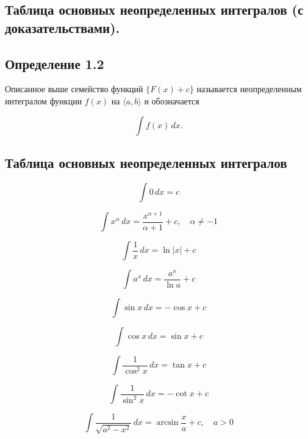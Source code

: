 {
\subsection{Таблица основных неопределенных интегралов (с доказательствами).}
\subsection*{Определение 1.2}

Описанное выше семейство функций \( \{F(x) + c\} \) называется неопределенным интегралом функции \( f(x) \) на \( \langle a,b \rangle \) и обозначается

\[
\int f(x) \,dx.
\]

\subsection*{Таблица основных неопределенных интегралов}

\begin{equation}
\int 0 \,dx = c
\end{equation}

\begin{equation}
\int x^\alpha \,dx = \frac{x^{\alpha+1}}{\alpha+1} + c, \quad \alpha \neq -1
\end{equation}

\begin{equation}
\int \frac{1}{x} \,dx = \ln |x| + c
\end{equation}

\begin{equation}
\int a^x \,dx = \frac{a^x}{\ln a} + c
\end{equation}

\begin{equation}
\int \sin x \,dx = -\cos x + c
\end{equation}

\begin{equation}
\int \cos x \,dx = \sin x + c
\end{equation}

\begin{equation}
\int \frac{1}{\cos^2 x} \,dx = \tan x + c
\end{equation}

\begin{equation}
\int \frac{1}{\sin^2 x} \,dx = -\cot x + c
\end{equation}

\begin{equation}
\int \frac{1}{\sqrt{a^2 - x^2}} \,dx = \arcsin \frac{x}{a} + c, \quad a > 0
\end{equation}

}
